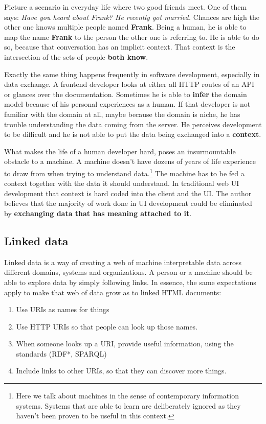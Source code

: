 Picture a scenario in everyday life where two good friends meet. One of them says: \textit{Have you heard about Frank? He recently got married.} Chances are high the other one knows multiple people named \textbf{Frank}. Being a human, he is able to map the name \textbf{Frank} to the person the other one is referring to. He is able to do so, because that conversation has an implicit context. That context is the intersection of the sets of people \textbf{both know}.
\par Exactly the same thing happens frequently in software development, especially in data exchange. A frontend developer looks at either all HTTP routes of an API or glances over the documentation. Sometimes he is able to \textbf{infer} the domain model because of his personal experiences as a human. If that developer is not familiar with the domain at all, maybe because the domain is niche, he has trouble understanding the data coming from the server. He perceives development to be difficult and he is not able to put the data being exchanged into a \textbf{context}.
\par What makes the life of a human developer hard, poses an insurmountable obstacle to a machine. A machine doesn't have dozens of years of life experience to draw from when trying to understand data.\footnote{Here we talk about machines in the sense of contemporary information systems. Systems that are able to learn are deliberately ignored as they haven't been proven to be useful in this context.} The machine has to be fed a context together with the data it should understand. In traditional web UI development that context is hard coded into the client and the UI. The author believes that the majority of work done in UI development could be eliminated by \textbf{exchanging data that has meaning attached to it}.

\subsection{Linked data}\label{linkeddata}

Linked data is a way of creating a web of machine interpretable data across different domains, systems and organizations. A person or a machine should be able to explore data by simply following links. In essence, the same expectations apply to make that web of data grow as to linked HTML documents: \citep{linkedatafourrules}

\begin{enumerate}
  \item Use URIs as names for things
  \item Use HTTP URIs so that people can look up those names.
  \item When someone looks up a URI, provide useful information, using the standards (RDF*, SPARQL)
  \item Include links to other URIs, so that they can discover more things.
\end{enumerate}

